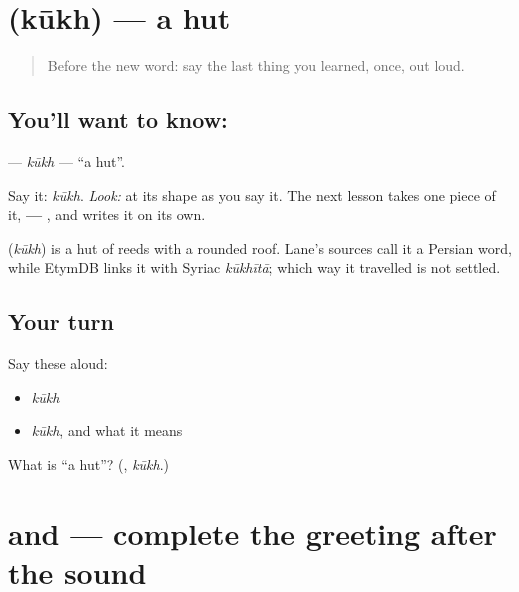 \section[\texorpdfstring{\ar{كوخ} (kūkh)}{كوخ (kūkh)}]{ (kūkh) — a hut}

\label{lesson:AR-C01-kukh}



\begin{quote}
Before the new word: say the last thing you learned, once, out loud.
\end{quote}

\subsection*{You'll want to know: }
\textbf{} — \emph{kūkh} — \textquotedblleft{}a hut\textquotedblright{}.

Say it: \emph{kūkh}. \emph{Look:} at its shape as you say it. The next lesson takes one piece of it, \textbf{  —  }, and writes it on its own.

\begin{cousinweb}
\textbf{} (\emph{kūkh}) is a hut of reeds with a rounded roof. Lane's sources call it a Persian word, while EtymDB links it with Syriac \emph{kūkhītā}; which way it travelled is not settled.
\end{cousinweb}

\subsection*{Your turn}
Say these aloud:

\begin{itemize}
\raggedright
  \item \emph{kūkh}
  \item \emph{kūkh}, and what it means
\end{itemize}

\begin{tcolorbox}[breakable,colback=teal!4,colframe=teal!35!black,title={Before you move on}]
What is \textquotedblleft{}a hut\textquotedblright{}? (\textbf{}, \emph{kūkh}.)
\end{tcolorbox}
\section[\texorpdfstring{\ar{ك} \ar{و} — \ar{السلام} \ar{عليكم} (kāf, wāw …)}{ك و — السلام عليكم (kāf, wāw …)}]{ and  — complete the greeting after the sound}

